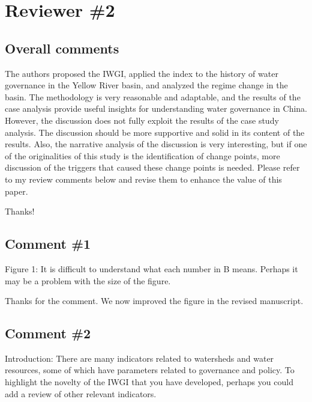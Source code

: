 \section{Reviewer \#2}\label{reviewer_2}

\subsection*{Overall comments}
\RC{} The authors proposed the IWGI, applied the index to the history of water governance in the Yellow River basin, and analyzed the regime change in the basin. The methodology is very reasonable and adaptable, and the results of the case analysis provide useful insights for understanding water governance in China. However, the discussion does not fully exploit the results of the case study analysis. The discussion should be more supportive and solid in its content of the results. Also, the narrative analysis of the discussion is very interesting, but if one of the originalities of this study is the identification of change points, more discussion of the triggers that caused these change points is needed. Please refer to my review comments below and revise them to enhance the value of this paper.

\AR{} Thanks!

\subsection{Comment \#1}
\RC{} Figure 1: It is difficult to understand what each number in B means. Perhaps it may be a problem with the size of the figure.

\AR{} Thanks for the comment. We now improved the figure in the revised manuscript. %

\subsection{Comment \#2}
\RC{} Introduction: There are many indicators related to watersheds and water resources, some of which have parameters related to governance and policy. To highlight the novelty of the IWGI that you have developed, perhaps you could add a review of other relevant indicators.

